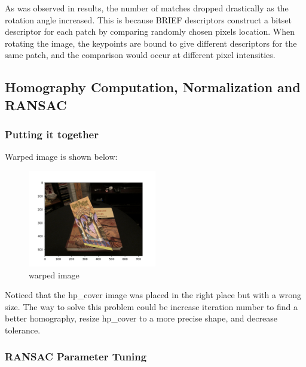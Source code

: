 \documentclass[11pt]{article} \usepackage{fullpage} \usepackage{graphicx} \usepackage{epstopdf} \usepackage{color} \usepackage{psfrag} \usepackage{pdfsync}\usepackage{indentfirst}\usepackage{subfigure}\usepackage{float}\usepackage[section]{placeins}
\begin{document}
As was observed in results, the number of matches dropped drastically as the rotation angle increased. This is because BRIEF descriptors construct a bitset descriptor for each patch by comparing randomly chosen pixels location. When rotating the image, the keypoints are bound to give different descriptors for the same patch, and the comparison would occur at different pixel intensities.

\setcounter{subsection}{1}
\subsection{Homography Computation, Normalization and RANSAC}

\setcounter{subsubsection}{3}
\subsubsection{Putting it together}

Warped image is shown below:
\begin{figure}[H]
\centering
\includegraphics[width=0.5\textwidth]{results/q2_2_4.png}
\caption{warped image}
\end{figure}

Noticed that the hp\_cover image was placed in the right place but with a wrong size. The way to solve this problem could be increase iteration number to find a better homography, resize hp\_cover to a more precise shape, and decrease tolerance.

\subsubsection{RANSAC Parameter Tuning}
\end{document}
